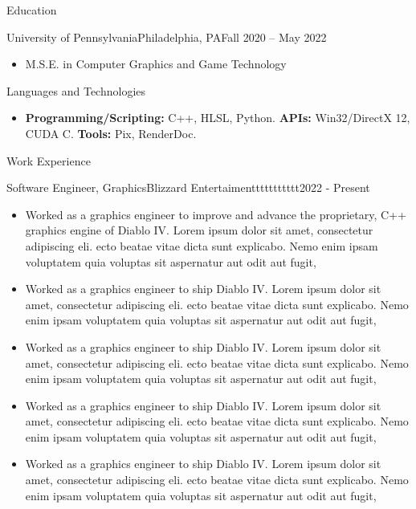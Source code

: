 \documentclass[]{mcdowellcv}
\begin{document}
	\makeheader
	

	\begin{cvsection}{Education}
		\begin{cvsubsection}{University of Pennsylvania}{Philadelphia, PA}{Fall 2020 -- May 2022}
			\begin{itemize}
				\item M.S.E. in Computer Graphics and Game Technology
			\end{itemize}
		\end{cvsubsection}
	\end{cvsection}

	\begin{cvsection}{Languages and Technologies}
		\begin{cvsubsection}{}{}{}	
			\begin{itemize}
				\item \textbf{Programming/Scripting:} C++, HLSL, Python. \textbf{APIs:} Win32/DirectX 12, CUDA C. \textbf{Tools:} Pix, RenderDoc.
			\end{itemize}
		\end{cvsubsection}
	\end{cvsection}

	\begin{cvsection}{Work Experience}
		\begin{cvsubsection}{Software Engineer, Graphics}{Blizzard Entertaimenttttttttttt}{2022 - Present}	
			\begin{itemize}
				\item Worked as a graphics engineer to improve and advance the proprietary, C++ graphics engine of Diablo IV. Lorem ipsum dolor sit amet, consectetur adipiscing eli. ecto beatae vitae dicta sunt explicabo. Nemo enim ipsam voluptatem quia voluptas sit aspernatur aut odit aut fugit, 
				\item Worked as a graphics engineer to ship Diablo IV. Lorem ipsum dolor sit amet, consectetur adipiscing eli. ecto beatae vitae dicta sunt explicabo. Nemo enim ipsam voluptatem quia voluptas sit aspernatur aut odit aut fugit, 
				\item Worked as a graphics engineer to ship Diablo IV. Lorem ipsum dolor sit amet, consectetur adipiscing eli. ecto beatae vitae dicta sunt explicabo. Nemo enim ipsam voluptatem quia voluptas sit aspernatur aut odit aut fugit, 
				\item Worked as a graphics engineer to ship Diablo IV. Lorem ipsum dolor sit amet, consectetur adipiscing eli. ecto beatae vitae dicta sunt explicabo. Nemo enim ipsam voluptatem quia voluptas sit aspernatur aut odit aut fugit, 
				\item Worked as a graphics engineer to ship Diablo IV. Lorem ipsum dolor sit amet, consectetur adipiscing eli. ecto beatae vitae dicta sunt explicabo. Nemo enim ipsam voluptatem quia voluptas sit aspernatur aut odit aut fugit, 
			\end{itemize}
		\end{cvsubsection}
	\end{cvsection}
	
\end{document}
